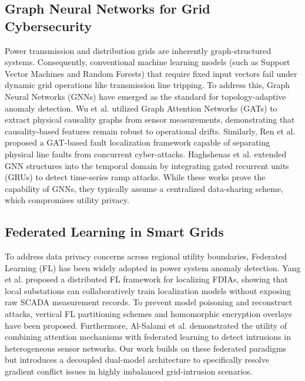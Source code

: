\documentclass[10pt, a4paper, twocolumn]{article}
\begin{document}
\subsection{Graph Neural Networks for Grid Cybersecurity}
Power transmission and distribution grids are inherently graph-structured systems. Consequently, conventional machine learning models (such as Support Vector Machines and Random Forests) that require fixed input vectors fail under dynamic grid operations like transmission line tripping. To address this, Graph Neural Networks (GNNs) have emerged as the standard for topology-adaptive anomaly detection. Wu et al. \cite{wu_causality} utilized Graph Attention Networks (GATs) to extract physical causality graphs from sensor measurements, demonstrating that causality-based features remain robust to operational drifts. Similarly, Ren et al. \cite{ren_pcpa} proposed a GAT-based fault localization framework capable of separating physical line faults from concurrent cyber-attacks. Haghshenas et al. \cite{haghshenas_temporal} extended GNN structures into the temporal domain by integrating gated recurrent units (GRUs) to detect time-series ramp attacks. While these works prove the capability of GNNs, they typically assume a centralized data-sharing scheme, which compromises utility privacy.

\subsection{Federated Learning in Smart Grids}
To address data privacy concerns across regional utility boundaries, Federated Learning (FL) has been widely adopted in power system anomaly detection. Yang et al. \cite{yang_fed_loc} proposed a distributed FL framework for localizing FDIAs, showing that local substations can collaboratively train localization models without exposing raw SCADA measurement records. To prevent model poisoning and reconstruct attacks, vertical FL partitioning schemes \cite{li_vertical} and homomorphic encryption overlays \cite{lu_privacy} have been proposed. Furthermore, Al-Salami et al. \cite{alsalami_fed_attention} demonstrated the utility of combining attention mechanisms with federated learning to detect intrusions in heterogeneous sensor networks. Our work builds on these federated paradigms but introduces a decoupled dual-model architecture to specifically resolve gradient conflict issues in highly imbalanced grid-intrusion scenarios.
\end{document}
